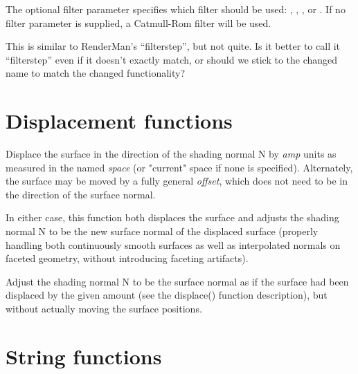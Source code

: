 \documentclass[11pt,letterpaper]{book}
\def\N{{\cf N}\xspace}
\def\currentspace{{\cf "current"} space\xspace}
\begin{document}
The optional {\cf filter} parameter specifies which filter should be
used: , , , or .
If no {\cf filter} parameter is supplied, a Catmull-Rom filter will be
used.

\begin{annotate}
\QUESTION This is similar to RenderMan's ``filterstep'', but not quite.
Is it better to call it ``filterstep'' even if it doesn't exactly match,
or should we stick to the changed name to match the changed functionality?
\end{annotate}
\apiend


\section{Displacement functions}
\label{sec:stdlib:displace}


Displace the surface in the direction of the shading normal \N by
\emph{amp} units as measured in the named \emph{space} (or \currentspace
if none is specified).  Alternately, the surface may be moved by a fully
general \emph{offset}, which does not need to be in the direction of the
surface normal.

In either case, this function both displaces the surface and adjusts the
shading normal \N to be the new surface normal of the displaced surface
(properly handling both continuously smooth surfaces as well as
interpolated normals on faceted geometry, without introducing faceting
artifacts).
\apiend


Adjust the shading normal \N to be the surface normal as if the
surface had been displaced by the given amount (see the {\cf displace()}
function description), but without actually moving the surface
positions.
\apiend


\section{String functions}
\label{sec:stdlib:string}
\end{document}
